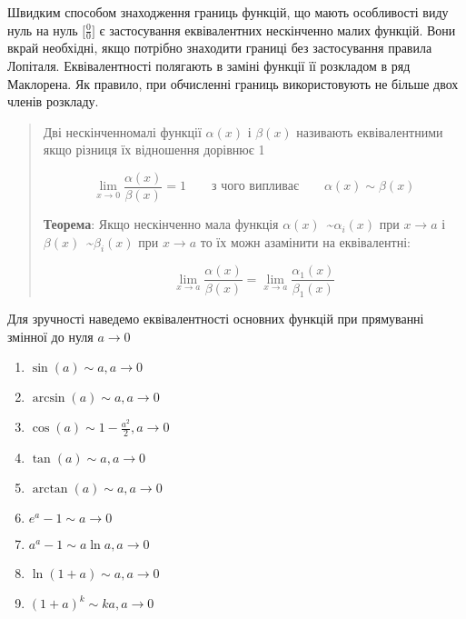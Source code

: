 
\begin{center}\large{}\end{center}

Швидким способом знаходження границь функцій, що мають особливості виду нуль на нуль $\big[\frac{0}{0}\big]$ є застосування еквівалентних нескінченно малих функцій. Вони вкрай необхідні, якщо потрібно знаходити границі без застосування правила Лопіталя. Еквівалентності полягають в заміні функції її розкладом в ряд Маклорена. Як правило, при обчисленні границь використовують не більше двох членів розкладу.

\begin{quote}
Дві нескінченномалі функції $\alpha(x)$ і $\beta(x)$ називають еквівалентними якщо різниця їх відношення дорівнює 1

\begin{displaymath}
  \lim_{x \to 0}\frac{\alpha(x)}{\beta(x)} = 1 \qquad \text{з чого випливає} \qquad \alpha(x) \sim \beta(x)
\end{displaymath}

\textbf{Теорема}: Якщо нескінченно мала функція \mbox{$\alpha(x)$ \sim $\alpha_i(x)$} при $x\to{a}$ і \mbox{$\beta(x)$ \sim $\beta_i(x)$} при $x\to{a}$  то їх можн азамінити на еквівалентні:

\begin{displaymath}
  \lim_{x \to a}\frac{\alpha(x)}{\beta(x)} = \lim_{x \to a}\frac{\alpha_1(x)}{\beta_1(x)}
\end{displaymath}

\end{quote}

Для зручності наведемо еквівалентності основних функцій при прямуванні змінної до нуля $a \to 0 $

\begin{enumerate}
  \item $\sin(a) \sim a, a \to 0$
  \item $\arcsin(a) \sim a, a \to 0$
  \item $\cos(a) \sim 1-\frac{a^2}{2}, a \to 0$
  \item $\tan({a}) \sim a, a \to 0 $
  \item $\arctan({a}) \sim a, a \to 0 $
  \item $e^a-1 \sim a \to 0 $
  \item $a^a-1 \sim a\ln{a},  a \to 0 $
  \item $\ln(1+a) \sim a, a \to 0$
  \item $(1+a)^k \sim ka, a \to 0 $
\end{enumerate}
